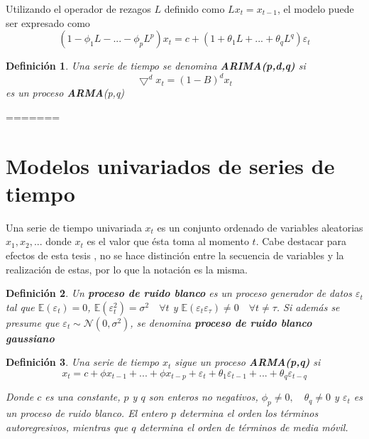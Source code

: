 \documentclass[12pt, twoside]{book}\usepackage[]{graphicx}\usepackage[]{color}
\numberwithin{equation}{section}
\numberwithin{theorem}{section}
\numberwithin{teorema}{section}
\newtheorem{defi}{Definición}
\newenvironment{defin}
      {\begin{shaded}\begin{defi}}
      {\end{defi}\end{shaded}}
\numberwithin{defi}{section}
\numberwithin{prop}{section}
\numberwithin{defi}{section}
\theoremstyle{plain}
\begin{document}
Utilizando el operador de rezagos $L$ definido como $Lx_{t}=x_{t-1}$, el modelo puede ser expresado como 
\begin{equation}
(1-\phi_{1}L-...-\phi_{p}L^{p})x_{t} = c+(1+\theta_{1}L+...+\theta_{q}L^{q})\varepsilon_{t}
\end{equation}

\begin{defin}
Una serie de tiempo se denomina \textbf{ARIMA(p,d,q)} si 
\begin{equation}
\bigtriangledown^{d}x_{t} = (1-B)^{d}x_{t} 
\end{equation}
es un proceso \textbf{ARMA}(p,q)
\end{defin}

=======

\section{Modelos univariados de series de tiempo}

Una serie de tiempo univariada $x_{t}$ es un conjunto ordenado de variables aleatorias $x_{1},x_{2},...$ donde $x_{t}$ es el valor que ésta toma al momento $t$. Cabe destacar para efectos de esta tesis , no se hace distinción entre la secuencia de variables y la realización de estas, por lo que la notación es la misma. 

\begin{defin}
Un \textbf{proceso de ruido blanco} es un proceso generador de datos $\varepsilon_{t}$ tal que $\mathbb{E}(\varepsilon_{t})=0$, $\mathbb{E}(\varepsilon_{t}^{2})=\sigma^{2}\quad \forall t$ y $\mathbb{E}(\varepsilon_{t}\varepsilon_{\tau})\neq 0\quad \forall t\neq \tau$. Si además se presume que $\varepsilon_{t}\sim \mathcal{N}(0,\sigma^{2})$, se denomina \textbf{proceso de ruido blanco gaussiano}
\end{defin}

\begin{defin}
Una serie de tiempo $x_{t}$ sigue un proceso \textbf{ARMA(p,q)} si 
\begin{equation}
x_{t}  = c +\phi x_{t-1}+...+\phi x_{t-p}+\varepsilon_{t}+\theta_{1}\varepsilon_{t-1}+...+\theta_{q}\varepsilon_{t-q}
\end{equation}

Donde $c$ es una constante, $p$ y $q$ son enteros no negativos, $\phi_{p}\neq 0,\quad \theta_{q}\neq 0$ y $\varepsilon_{t}$ es un proceso de ruido blanco. El entero $p$ determina el orden los términos autoregresivos, mientras que $q$ determina el orden de términos de media móvil.   

\end{defin}
\end{document}
